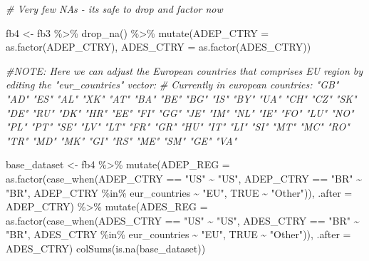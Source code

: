 \documentclass[conference,final,]{IEEEtran}
\newenvironment{Shaded}{\begin{snugshade}}{\end{snugshade}}
\newcommand{\AttributeTok}[1]{\textcolor[rgb]{0.77,0.63,0.00}{#1}}
\newcommand{\CommentTok}[1]{\textcolor[rgb]{0.56,0.35,0.01}{\textit{#1}}}
\newcommand{\ConstantTok}[1]{\textcolor[rgb]{0.00,0.00,0.00}{#1}}
\newcommand{\FunctionTok}[1]{\textcolor[rgb]{0.00,0.00,0.00}{#1}}
\newcommand{\NormalTok}[1]{#1}
\newcommand{\OtherTok}[1]{\textcolor[rgb]{0.56,0.35,0.01}{#1}}
\newcommand{\SpecialCharTok}[1]{\textcolor[rgb]{0.00,0.00,0.00}{#1}}
\newcommand{\StringTok}[1]{\textcolor[rgb]{0.31,0.60,0.02}{#1}}
\begin{document}
\begin{Shaded}
\begin{Highlighting}[]
\CommentTok{\# Very few NA\textquotesingle{}s {-} it\textquotesingle{}s safe to drop and factor now}

\NormalTok{fb4 }\OtherTok{\textless{}{-}}\NormalTok{ fb3 }\SpecialCharTok{\%\textgreater{}\%} \FunctionTok{drop\_na}\NormalTok{() }\SpecialCharTok{\%\textgreater{}\%} \FunctionTok{mutate}\NormalTok{(}\AttributeTok{ADEP\_CTRY =} \FunctionTok{as.factor}\NormalTok{(ADEP\_CTRY), }\AttributeTok{ADES\_CTRY =} \FunctionTok{as.factor}\NormalTok{(ADES\_CTRY))}

\CommentTok{\#NOTE: Here we can adjust the European countries that comprises EU region by editing the "eur\_countries" vector:}
\CommentTok{\# Currently in european countries: "GB" "AD" "ES" "AL" "XK" "AT" "BA" "BE" "BG" "IS" "BY" "UA" "CH" "CZ" "SK" "DE" "RU" "DK" "HR" "EE" "FI" "GG" "JE" "IM" "NL" "IE" "FO" "LU" "NO" "PL" "PT" "SE" "LV" "LT" "FR" "GR" "HU" "IT" "LI" "SI" "MT" "MC" "RO" "TR" "MD" "MK" "GI" "RS" "ME" "SM" "GE" "VA"}

\NormalTok{base\_dataset }\OtherTok{\textless{}{-}}\NormalTok{ fb4 }\SpecialCharTok{\%\textgreater{}\%} \FunctionTok{mutate}\NormalTok{(}\AttributeTok{ADEP\_REG =} \FunctionTok{as.factor}\NormalTok{(}\FunctionTok{case\_when}\NormalTok{(ADEP\_CTRY }\SpecialCharTok{==} \StringTok{"US"} \SpecialCharTok{\textasciitilde{}} \StringTok{"US"}\NormalTok{,}
\NormalTok{                                    ADEP\_CTRY }\SpecialCharTok{==} \StringTok{"BR"} \SpecialCharTok{\textasciitilde{}} \StringTok{"BR"}\NormalTok{,}
\NormalTok{                                    ADEP\_CTRY }\SpecialCharTok{\%in\%}\NormalTok{ eur\_countries }\SpecialCharTok{\textasciitilde{}} \StringTok{"EU"}\NormalTok{,}
                                    \ConstantTok{TRUE} \SpecialCharTok{\textasciitilde{}} \StringTok{"Other"}\NormalTok{)), }\AttributeTok{.after =}\NormalTok{ ADEP\_CTRY) }\SpecialCharTok{\%\textgreater{}\%}
                \FunctionTok{mutate}\NormalTok{(}\AttributeTok{ADES\_REG =} \FunctionTok{as.factor}\NormalTok{(}\FunctionTok{case\_when}\NormalTok{(ADES\_CTRY }\SpecialCharTok{==} \StringTok{"US"} \SpecialCharTok{\textasciitilde{}} \StringTok{"US"}\NormalTok{,}
\NormalTok{                                    ADES\_CTRY }\SpecialCharTok{==} \StringTok{"BR"} \SpecialCharTok{\textasciitilde{}} \StringTok{"BR"}\NormalTok{,}
\NormalTok{                                    ADES\_CTRY }\SpecialCharTok{\%in\%}\NormalTok{ eur\_countries }\SpecialCharTok{\textasciitilde{}} \StringTok{"EU"}\NormalTok{,}
                                    \ConstantTok{TRUE} \SpecialCharTok{\textasciitilde{}} \StringTok{"Other"}\NormalTok{)), }\AttributeTok{.after =}\NormalTok{ ADES\_CTRY)}
\FunctionTok{colSums}\NormalTok{(}\FunctionTok{is.na}\NormalTok{(base\_dataset))}
\end{Highlighting}
\end{Shaded}
\end{document}
